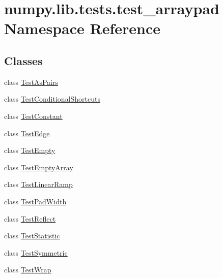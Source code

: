 \hypertarget{namespacenumpy_1_1lib_1_1tests_1_1test__arraypad}{}\section{numpy.\+lib.\+tests.\+test\+\_\+arraypad Namespace Reference}
\label{namespacenumpy_1_1lib_1_1tests_1_1test__arraypad}
\subsection*{Classes}
\begin{DoxyCompactItemize}
\item 
class \hyperlink{classnumpy_1_1lib_1_1tests_1_1test__arraypad_1_1TestAsPairs}{Test\+As\+Pairs}
\item 
class \hyperlink{classnumpy_1_1lib_1_1tests_1_1test__arraypad_1_1TestConditionalShortcuts}{Test\+Conditional\+Shortcuts}
\item 
class \hyperlink{classnumpy_1_1lib_1_1tests_1_1test__arraypad_1_1TestConstant}{Test\+Constant}
\item 
class \hyperlink{classnumpy_1_1lib_1_1tests_1_1test__arraypad_1_1TestEdge}{Test\+Edge}
\item 
class \hyperlink{classnumpy_1_1lib_1_1tests_1_1test__arraypad_1_1TestEmpty}{Test\+Empty}
\item 
class \hyperlink{classnumpy_1_1lib_1_1tests_1_1test__arraypad_1_1TestEmptyArray}{Test\+Empty\+Array}
\item 
class \hyperlink{classnumpy_1_1lib_1_1tests_1_1test__arraypad_1_1TestLinearRamp}{Test\+Linear\+Ramp}
\item 
class \hyperlink{classnumpy_1_1lib_1_1tests_1_1test__arraypad_1_1TestPadWidth}{Test\+Pad\+Width}
\item 
class \hyperlink{classnumpy_1_1lib_1_1tests_1_1test__arraypad_1_1TestReflect}{Test\+Reflect}
\item 
class \hyperlink{classnumpy_1_1lib_1_1tests_1_1test__arraypad_1_1TestStatistic}{Test\+Statistic}
\item 
class \hyperlink{classnumpy_1_1lib_1_1tests_1_1test__arraypad_1_1TestSymmetric}{Test\+Symmetric}
\item 
class \hyperlink{classnumpy_1_1lib_1_1tests_1_1test__arraypad_1_1TestWrap}{Test\+Wrap}
\end{DoxyCompactItemize}
